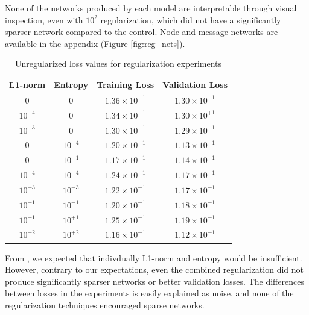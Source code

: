 \documentclass{article}
\begin{document}
None of the networks produced by each model are interpretable through visual inspection, even with $10^{2}$ regularization, which did not have a significantly sparser network compared to the control. Node and message networks are available in the appendix (Figure \ref{fig:reg_nets}).

\begin{table}
    \centering
  \caption{Unregularized loss values for regularization experiments}
  \label{tab:regularization}
  \centering
    \begin{tabular}{c c | c c }
    \hline
    L1-norm & Entropy & Training Loss & Validation Loss \\
    \hline
    $0$ & $0$ & $1.36\times 10^{-1}$ & $1.30 \times 10^{-1}$ \\
    $10^{-4}$ & $0$ & $1.34\times 10^{-1}$ & $1.30\times10^{+1}$ \\
    $10^{-3}$ & $0$ & $1.30\times10^{-1}$ & $1.29\times10^{-1}$ \\

    $0$ & $10^{-4}$ & $1.20\times10^{-1}$ & $1.13\times10^{-1}$ \\
    $0$ & $10^{-1}$ & $1.17\times10^{-1}$ & $1.14\times10^{-1}$ \\

    $10^{-4}$ & $10^{-4}$ & $1.24\times10^{-1}$ & $1.17\times10^{-1}$ \\
    $10^{-3}$ & $10^{-3}$ & $1.22\times10^{-1}$ & $1.17\times10^{-1}$ \\
    $10^{-1}$ & $10^{-1}$ & $1.20\times10^{-1}$ & $1.18\times10^{-1}$ \\
    $10^{+1}$ & $10^{+1}$ & $1.25\times10^{-1}$ & $1.19\times10^{-1}$ \\
    $10^{+2}$ & $10^{+2}$ & $1.16\times10^{-1}$ & $1.12\times10^{-1}$ \\
    \hline
    \end{tabular}
\end{table}

From \cite{liu2024kankolmogorovarnoldnetworks}, we expected that indivdually L1-norm and entropy would be insufficient. However, contrary to our expectations, even the combined regularization did not produce significantly sparser networks or better validation losses. The differences between losses in the experiments is easily explained as noise, and none of the regularization techniques encouraged sparse networks. 
\end{document}

